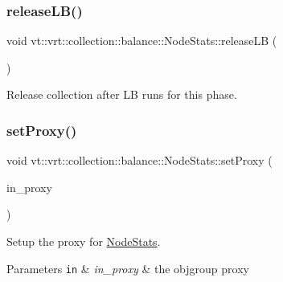 \subsubsection{\texorpdfstring{release\+L\+B()}{releaseLB()}}
{\footnotesize\ttfamily void vt\+::vrt\+::collection\+::balance\+::\+Node\+Stats\+::release\+LB (\begin{DoxyParamCaption}{ }\end{DoxyParamCaption})}



Release collection after LB runs for this phase. 

\mbox{\label{structvt_1_1vrt_1_1collection_1_1balance_1_1_node_stats_a30e9e5def6e7d6d31cd6597c5fea2345}} 
\subsubsection{\texorpdfstring{set\+Proxy()}{setProxy()}}
{\footnotesize\ttfamily void vt\+::vrt\+::collection\+::balance\+::\+Node\+Stats\+::set\+Proxy (\begin{DoxyParamCaption}\item[{\hyperlink{structvt_1_1objgroup_1_1proxy_1_1_proxy}{objgroup\+::proxy\+::\+Proxy}$<$ \hyperlink{structvt_1_1vrt_1_1collection_1_1balance_1_1_node_stats}{Node\+Stats} $>$}]{in\+\_\+proxy }\end{DoxyParamCaption})\hspace{0.3cm}{\ttfamily [private]}}



Setup the proxy for {\ttfamily \hyperlink{structvt_1_1vrt_1_1collection_1_1balance_1_1_node_stats}{Node\+Stats}}. 


\begin{DoxyParams}[1]{Parameters}
\mbox{\tt in}  & {\em in\+\_\+proxy} & the objgroup proxy \\
\hline
\end{DoxyParams}
\mbox{\label{structvt_1_1vrt_1_1collection_1_1balance_1_1_node_stats_ae76790d41701769b86ef15e4924d661d}} 
